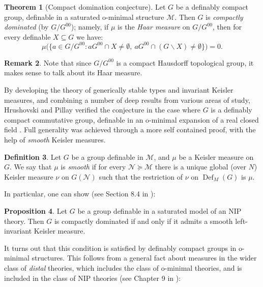 \documentclass[a4paper]{report}
\newcommand{\ind}{\hspace{15pt}}
\newcommand{\M}{\mathcal{M}}
\newcommand{\N}{\mathcal{N}}
\DeclareMathOperator{\Def}{Def}
\theoremstyle{definition}
\newtheorem{thm}{Theorem}[chapter]
\newtheorem{prop}[thm]{Proposition}
\newtheorem{defn}[thm]{Definition}
\theoremstyle{remstyle}
\newtheorem{rem}[thm]{Remark}
\begin{document}
\begin{thm}[Compact domination conjecture]\label{compact dom}
	Let $G$ be a definably compact group, definable in a saturated o-minimal structure $\M$. Then $G$ is \emph{compactly dominated} (by $G/G^{00}$); namely, if $\mu$ is the \emph{Haar measure} on $G/G^{00}$, then for every definable $X\subseteq G$ we have:
	\begin{equation*}
		\mu\big(\{a\in G/G^{00}: aG^{00}\cap X\neq \emptyset,\: aG^{00}\cap (G\backslash X)\neq\emptyset\}\big) = 0.
	\end{equation*}
\end{thm}

\begin{rem}
	Note that since $G/G^{00}$ is a compact Hausdorff topological group, it makes sense to talk about its Haar measure.
\end{rem}

\ind By developing the theory of generically stable types and invariant Keisler measures, and combining a number of deep results from various areas of study, Hrushovski and Pillay verified the conjecture in the case where $G$ is a definably compact commutative group, definable in an o-minimal expansion of a real closed field \cite{nip inv meas}. Full generality was achieved through a more self contained proof, with the help of \emph{smooth} Keisler measures.

\begin{defn}
	Let $G$ be a group definable in $\M$, and $\mu$ be a Keisler measure on $G$. We say that $\mu$ is \emph{smooth} if for every $\N\succeq\M$ there is a unique global (over $N$) Keisler measure $\nu$ on $G(\N)$ such that the restriction of $\nu$ on $\Def_M(G)$ is $\mu$.
\end{defn}

\ind In particular, one can show (see Section 8.4 in \cite{nip guide}):

\begin{prop}\label{smooth}
	Let $G$ be a group definable in a saturated model of an NIP theory. Then $G$ is compactly dominated if and only if it admits a smooth left-invariant Keisler measure.
\end{prop}

\ind It turns out that this condition is satisfied by definably compact groups in o-minimal structures. This follows from a general fact about measures in the wider class of \emph{distal} theories, which includes the class of o-minimal theories, and is included in the class of NIP theories (see Chapter 9 in \cite{nip guide}):
\end{document}
